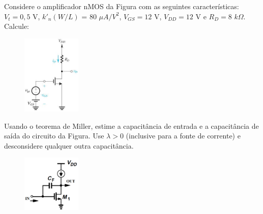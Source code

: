 \documentclass[addpoints]{exam}
\begin{document}
\begin{questions}

\question Considere o amplificador nMOS da Figura com as seguintes características: $V_t = 0,5$ V, $k'_n(W/L)$ = 80 $\mu A/V^2$, $V_{GS} = 12$ V, $V_{DD} = 12$ V e $R_D = 8$ $k\Omega$. Calcule: 

 
\begin{figure}[!h]
  \centering
  \includegraphics[width=0.25\textwidth]{imagens/1.png}
  \label{fig:1}
\end{figure}
 
\question[2] Usando o teorema de Miller, estime a capacitância de entrada e a capacitância de saída do circuito da Figura. Use $\lambda > 0$ (inclusive para a fonte de corrente) e desconsidere qualquer outra capacitância.

\begin{figure}[!h]
  \centering
  \includegraphics[width=0.25\textwidth]{imagens/2.png}
  \label{fig:2}
\end{figure}


\end{questions}
\end{document}
